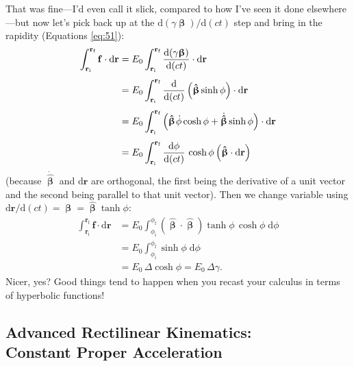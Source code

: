 \documentclass[12pt]{article}
\renewcommand{\vv}[1]{\mathbf{#1}}
\newcommand{\dd}[1]{\mathrm{d}#1}
\newcommand{\vvbeta}{\bm{\upbeta}}
\newcommand{\hatbeta}{\bm{\hat{\upbeta}}}
\begin{document}
That was fine---I'd even call it slick, compared to how I've seen it done elsewhere---but now let's pick back up at the $\dd (\gamma \vvbeta) / \dd (ct)$ step and bring in the rapidity (Equations \ref{eq:51}):
\begin{equation*}
\begin{aligned}
\int_{\vv r_\textrm{i}}^{\vv r_{\textrm{f}}} \vv f \cdot \dd \vv r &= E_0 \int_{\vv r_\textrm{i}}^{\vv r_{\textrm{f}}} \frac{\dd (\gamma \vvbeta)}{\dd (ct)} \cdot \dd \vv r \\[4pt]
&= E_0 \int_{\vv r_\textrm{i}}^{\vv r_{\textrm{f}}} \frac{\dd}{\dd (ct)} \left( \hatbeta \sinh{\phi} \right) \cdot \dd \vv r \\[4pt]
&= E_0 \int_{\vv r_\textrm{i}}^{\vv r_{\textrm{f}}} \left( \hatbeta \mkern1.5mu \dot{\phi} \cosh{\phi} + \dot{\hatbeta} \sinh{\phi} \right) \cdot \dd \vv r  \\[4pt]
&= E_0 \int_{\vv r_\textrm{i}}^{\vv r_{\textrm{f}}} \frac{\dd \phi}{\dd (ct)} \, \cosh{\phi} \left( \hatbeta \cdot \dd \vv r \right)
\end{aligned}
\end{equation*}
(because $\dot{\hatbeta}$ and $\dd \vv r$ are orthogonal, the first being the derivative of a unit vector and the second being parallel to that unit vector). Then we change variable using ${\dd \vv r / \dd (ct) = \vvbeta = \hatbeta \tanh{\phi}}$:
\begin{equation*}
\begin{aligned}
\int_{\vv r_\textrm{i}}^{\vv r_{\textrm{f}}} \vv f \cdot \dd \vv r &= E_0 \int_{\phi_\textrm{i}}^{\phi_{\textrm{f}}} \left( \hatbeta \cdot \hatbeta \right) \tanh{\phi} \, \cosh{\phi} \; \dd \phi \\[4pt]
&= E_0 \int_{\phi_\textrm{i}}^{\phi_{\textrm{f}}} \sinh{\phi} \; \dd \phi \\[4pt]
&= E_0 \, \Delta \cosh{\phi} = E_0 \, \Delta \gamma .
\end{aligned}
\end{equation*}
Nicer, yes? Good things tend to happen when you recast your calculus in terms of hyperbolic functions!

\subsection[Advanced Rectilinear Kinematics: Constant Proper Acceleration]{Advanced Rectilinear Kinematics:\\ Constant Proper Acceleration}\label{ssec:ak}
\end{document}
